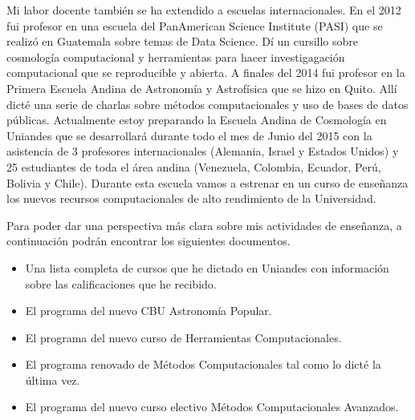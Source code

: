 \documentclass[letterpaper,12pt,onecolumn]{article}
\begin{document}
Mi labor docente tambi\'en se ha extendido a escuelas
internacionales. En el 2012 fui profesor en una escuela del
PanAmerican Science Institute (PASI) que se realiz\'o en Guatemala sobre
temas de Data Science. D\'i un cursillo sobre cosmolog\'ia
computacional y herramientas para hacer investigagaci\'on computacional
que se reproducible y abierta. A finales del 2014 fui profesor en la
Primera Escuela Andina de Astronom\'ia y Astrof\'isica que se hizo en
Quito. All\'i dict\'e una serie de charlas sobre m\'etodos computacionales y
uso de bases de datos p\'ublicas. Actualmente estoy preparando la
Escuela Andina de Cosmolog\'ia en Uniandes que se desarrollar\'a durante
todo el mes de Junio del 2015 con la asistencia de 3 profesores
internacionales (Alemania, Israel y Estados Unidos) y 25 estudiantes
de toda el \'area andina (Venezuela, Colombia, Ecuador, Per\'u, Bolivia y
Chile). Durante esta escuela vamos a estrenar en un curso de
ense\~nanza los nuevos recursos computacionales de alto rendimiento de
la Universidad.


Para poder dar una perspectiva m\'as clara sobre mis actividades de
ense\~nanza, a continuaci\'on podr\'an encontrar los siguientes documentos.
\begin{itemize}
\item Una lista completa de cursos que he dictado en Uniandes con
  informaci\'on sobre las calificaciones que he recibido. 
\item El programa del nuevo CBU Astronom\'ia Popular.
\item El programa del nuevo curso de Herramientas Computacionales.
\item El programa renovado de M\'etodos Computacionales tal como lo
  dict\'e la \'ultima vez.
\item El programa del nuevo curso electivo M\'etodos Computacionales
  Avanzados. 
\end{itemize}
\end{document}
